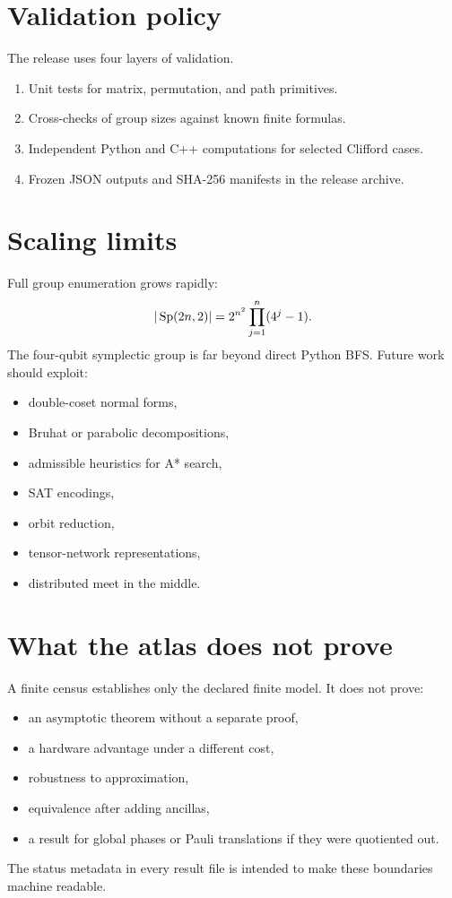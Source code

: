 \section{Validation policy}
The release uses four layers of validation.
\begin{enumerate}
\item Unit tests for matrix, permutation, and path primitives.
\item Cross-checks of group sizes against known finite formulas.
\item Independent Python and C++ computations for selected Clifford cases.
\item Frozen JSON outputs and SHA-256 manifests in the release archive.
\end{enumerate}

\section{Scaling limits}
Full group enumeration grows rapidly:
\[
|\operatorname{Sp}(2n,2)|
=2^{n^2}\prod_{j=1}^n(4^j-1).
\]
The four-qubit symplectic group is far beyond direct Python BFS.  Future work should exploit:
\begin{itemize}
\item double-coset normal forms,
\item Bruhat or parabolic decompositions,
\item admissible heuristics for A* search,
\item SAT encodings,
\item orbit reduction,
\item tensor-network representations,
\item distributed meet in the middle.
\end{itemize}

\section{What the atlas does not prove}
A finite census establishes only the declared finite model.  It does not prove:
\begin{itemize}
\item an asymptotic theorem without a separate proof,
\item a hardware advantage under a different cost,
\item robustness to approximation,
\item equivalence after adding ancillas,
\item a result for global phases or Pauli translations if they were quotiented out.
\end{itemize}
The status metadata in every result file is intended to make these boundaries machine readable.
